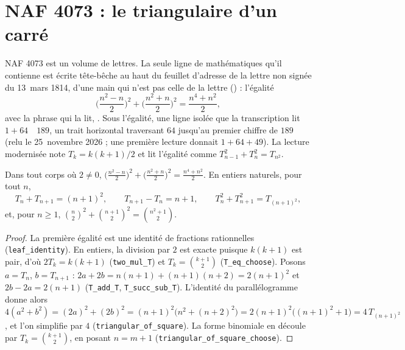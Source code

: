 \section[NAF 4073 : le triangulaire d'un carré]{NAF 4073 : le triangulaire d'un carré\protect{}}\label{sec:naf-4073}

NAF 4073 est un volume de lettres. La seule ligne de mathématiques qu'il contienne est écrite tête-bêche au haut du feuillet d'adresse de la lettre non signée du 13~mars 1814, d'une main qui n'est pas celle de la lettre () : l'égalité
\[ \Big(\frac{n^2 - n}{2}\Big)^2 + \Big(\frac{n^2 + n}{2}\Big)^2 = \frac{n^4 + n^2}{2}, \]
avec la phrase qui la lit, . Sous l'égalité, une ligne isolée que la transcription lit $1 + 64 \quad 189$, un trait horizontal traversant $64$ jusqu'au premier chiffre de $189$ (relu le 25~novembre 2026 ; une première lecture donnait $1 + 64 + 49$). La lecture modernisée note $T_k = k(k+1)/2$ et lit l'égalité comme $T_{n-1}^2 + T_n^2 = T_{n^2}$.

\begin{enonce}
Dans tout corps où $2 \neq 0$, $\big(\frac{n^2 - n}{2}\big)^2 + \big(\frac{n^2 + n}{2}\big)^2 = \frac{n^4 + n^2}{2}$. En entiers naturels, pour tout $n$,
\[ T_n + T_{n+1} = (n+1)^2, \qquad T_{n+1} - T_n = n + 1, \qquad T_n^2 + T_{n+1}^2 = T_{(n+1)^2}, \]
et, pour $n \geq 1$, $\binom{n}{2}^2 + \binom{n+1}{2}^2 = \binom{n^2+1}{2}$.
\end{enonce}

\begin{proof}
La première égalité est une identité de fractions rationnelles (\texttt{leaf\_identity}). En entiers, la division par $2$ est exacte puisque $k(k+1)$ est pair, d'où $2T_k = k(k+1)$ (\texttt{two\_mul\_T}) et $T_k = \binom{k+1}{2}$ (\texttt{T\_eq\_choose}). Posons $a = T_n$, $b = T_{n+1}$ : $2a + 2b = n(n+1) + (n+1)(n+2) = 2(n+1)^2$ et $2b - 2a = 2(n+1)$ (\texttt{T\_add\_T}, \texttt{T\_succ\_sub\_T}). L'identité du parallélogramme donne alors $4(a^2 + b^2) = (2a)^2 + (2b)^2 = (n+1)^2\big(n^2 + (n+2)^2\big) = 2(n+1)^2\big((n+1)^2 + 1\big) = 4\,T_{(n+1)^2}$, et l'on simplifie par $4$ (\texttt{triangular\_of\_square}). La forme binomiale en découle par $T_k = \binom{k+1}{2}$, en posant $n = m + 1$ (\texttt{triangular\_of\_square\_choose}).
\end{proof}

